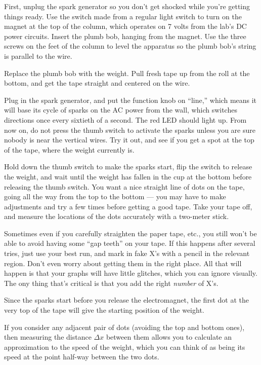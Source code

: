 First, unplug the spark generator so you don't get shocked
while you're getting things ready.  Use the switch made from
a regular light switch to turn on the magnet at the top of
the column, which operates on 7 volts from the lab's DC
power circuits.  Insert the plumb bob, hanging from the
magnet.  Use the three screws on the feet of the column to
level the apparatus so the plumb bob's string is parallel to the wire.

Replace the plumb bob with the weight.  Pull fresh tape up
from the roll at the bottom, and get the tape straight and
centered on the wire.

Plug in the spark generator, and put the function knob on
``line,'' which means it will base its cycle of sparks on
the AC power from the wall, which switches directions once
every sixtieth of a second.  The red LED should light up. 
From now on, do not press the thumb switch to activate the
sparks unless you are sure nobody is near the vertical
wires.  Try it out, and see if you get a spot at the top of
the tape, where the weight currently is.


Hold down the thumb switch to make the sparks start, flip
the switch to release the weight, and wait until the weight
has fallen in the cup at the bottom before releasing the
thumb switch.  You want a nice straight line of dots on the
tape, going all the way from the top to the bottom --- you
may have to make adjustments and try a few times before
getting a good tape.  Take your tape off, and measure the
locations of the dots accurately with a two-meter stick.

Sometimes even if you carefully straight\-en the
paper tape, etc., you still won't be able to avoid having
some ``gap teeth'' on your tape. If this happens after several
tries, just use your best run, and mark in fake X's with a pencil in the relevant region.
Don't even worry about getting them in the right place. All that
will happen is that your graphs will have little glitches, which you
can ignore visually. The ony thing that's critical is that you
add the right \emph{number} of X's.

\analysis

Since the sparks start before you release the electromagnet,
the first dot at the very top of the tape will give the
starting position of the weight.

If you consider any adjacent pair of dots (avoiding the top
and bottom ones), then measuring the distance $\Delta x$ between them
allows you to calculate an approximation to the speed of the
weight, which you can think of as being its speed at the
point half-way between the two dots.

